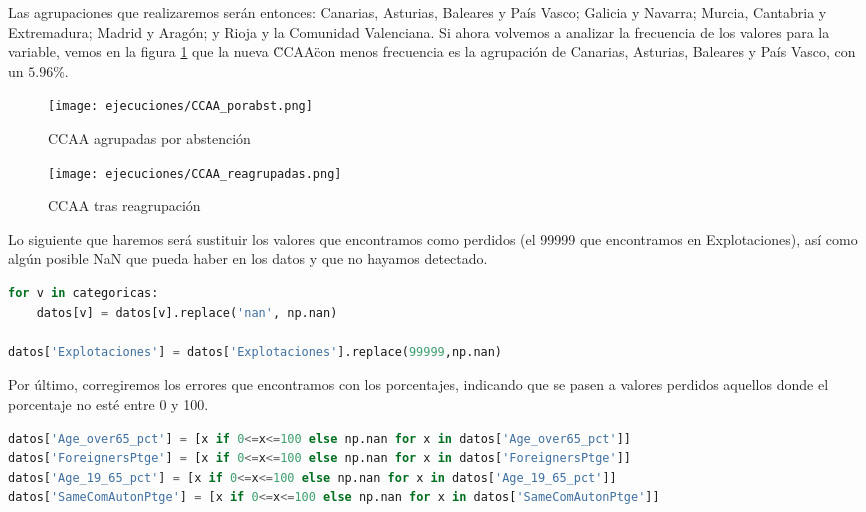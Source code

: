 \documentclass[a4paper,onecolumn]{extarticle}
\begin{document}
\begin{sloppypar}
Las agrupaciones que realizaremos serán entonces: Canarias, Asturias, Baleares y País Vasco; Galicia y Navarra; Murcia, Cantabria y Extremadura; Madrid y Aragón; 
y Rioja y la Comunidad Valenciana. Si ahora volvemos a analizar la frecuencia de los valores para la variable, vemos en la figura \ref{fig:CCAAreagrupada} que 
la nueva \"CCAA\" con menos frecuencia es la agrupación de Canarias, Asturias, Baleares y País Vasco, con un $5.96\%$.

\begin{figure}[h!]
    \centering
    \begin{minipage}{0.35\textwidth}
        \centering
        \texttt{[image: ejecuciones/CCAA\_porabst.png]}
        \caption{CCAA agrupadas por abstención}
        \label{fig:CCAAbypct}
    \end{minipage}%
    \hspace{0.05\textwidth} %
    \begin{minipage}{0.35\textwidth}
        \centering
        \texttt{[image: ejecuciones/CCAA\_reagrupadas.png]}
        \caption{CCAA tras reagrupación}
        \label{fig:CCAAreagrupada}
    \end{minipage}
\end{figure}

Lo siguiente que haremos será sustituir los valores que encontramos como perdidos (el 99999 que encontramos en Explotaciones), así como algún posible NaN que
pueda haber en los datos y que no hayamos detectado.
\begin{lstlisting}[language=Python]
for v in categoricas:
    datos[v] = datos[v].replace('nan', np.nan)
    
datos['Explotaciones'] = datos['Explotaciones'].replace(99999,np.nan)
\end{lstlisting}

Por último, corregiremos los errores que encontramos con los porcentajes, indicando que se pasen a valores perdidos aquellos donde el porcentaje no esté
entre 0 y 100.
\begin{lstlisting}[language=Python]
datos['Age_over65_pct'] = [x if 0<=x<=100 else np.nan for x in datos['Age_over65_pct']]
datos['ForeignersPtge'] = [x if 0<=x<=100 else np.nan for x in datos['ForeignersPtge']]
datos['Age_19_65_pct'] = [x if 0<=x<=100 else np.nan for x in datos['Age_19_65_pct']]
datos['SameComAutonPtge'] = [x if 0<=x<=100 else np.nan for x in datos['SameComAutonPtge']]
\end{lstlisting}


\end{sloppypar}
\end{document}
